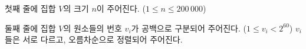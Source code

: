 첫째 줄에 집합 $V$의 크기 $n$이 주어진다. ($1 \leq n \leq 200\,000$)

둘째 줄에 집합 $V$의 원소들의 번호 $v_i$가 공백으로 구분되어 주어진다. ($1 \leq v_i < 2^{60}$) $v_i$들은 서로 다르고, 오름차순으로 정렬되어 주어진다.
